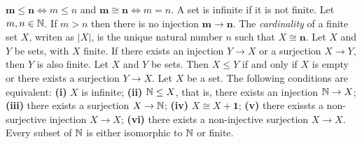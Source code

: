  $\mathbf{m} \leq \mathbf{n} \iff m \leq n$ and $\mathbf{m} \cong \mathbf{n} \iff m = n$.
 A set is infinite if it is not finite.
 Let $m, n \in \operatorname{\mathbb{N}}$. If $m > n$ then there is no injection $\mathbf{m} \to \mathbf{n}$.
 The \textit{cardinality} of a finite set $X$, writen as $|X|$, is the unique natural number $n$ such that $X \cong \mathbf{n}$.
 Let $X$ and $Y$ be sets, with $X$ finite. If there exists an injection $Y \to X$ or a surjection $X \to Y$, then $Y$ is also finite.
 Let $X$ and $Y$ be sets. Then $X \leq Y$ if and only if $X$ is empty or there exists a surjection $Y \to X$.
 Let $X$ be a set. The following conditions are equivalent: \textbf{(i)} $X$ is infinite; \textbf{(ii)} $\operatorname{\mathbb{N}} \leq X$, that is, there exists an injection $\operatorname{\mathbb{N}} \to X$; \textbf{(iii)} there exists a surjection $X \to \operatorname{\mathbb{N}}$; \textbf{(iv)} $X \cong X + \mathbf{1}$; \textbf{(v)} there exissts a non-surjective injection $X \to X$; \textbf{(vi)} there exists a non-injective surjection $X \to X$.
 Every subset of $\operatorname{\mathbb{N}}$ is either isomorphic to $\operatorname{\mathbb{N}}$ or finite.
